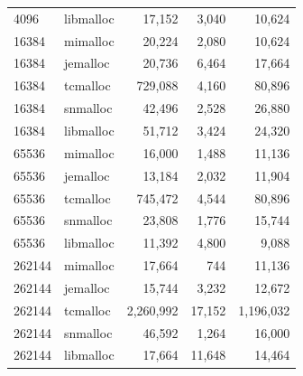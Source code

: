 \begin{table}[!htbp]
\begin{tabular}{llrrr}
4096 & libmalloc & 17{,}152 & 3{,}040 & 10{,}624 \\
16384 & mimalloc & 20{,}224 & 2{,}080 & 10{,}624 \\
16384 & jemalloc & 20{,}736 & 6{,}464 & 17{,}664 \\
16384 & tcmalloc & 729{,}088 & 4{,}160 & 80{,}896 \\
16384 & snmalloc & 42{,}496 & 2{,}528 & 26{,}880 \\
16384 & libmalloc & 51{,}712 & 3{,}424 & 24{,}320 \\
65536 & mimalloc & 16{,}000 & 1{,}488 & 11{,}136 \\
65536 & jemalloc & 13{,}184 & 2{,}032 & 11{,}904 \\
65536 & tcmalloc & 745{,}472 & 4{,}544 & 80{,}896 \\
65536 & snmalloc & 23{,}808 & 1{,}776 & 15{,}744 \\
65536 & libmalloc & 11{,}392 & 4{,}800 & 9{,}088 \\
262144 & mimalloc & 17{,}664 & 744 & 11{,}136 \\
262144 & jemalloc & 15{,}744 & 3{,}232 & 12{,}672 \\
262144 & tcmalloc & 2{,}260{,}992 & 17{,}152 & 1{,}196{,}032 \\
262144 & snmalloc & 46{,}592 & 1{,}264 & 16{,}000 \\
262144 & libmalloc & 17{,}664 & 11{,}648 & 14{,}464 \\
\bottomrule
\end{tabular}
\end{table}
